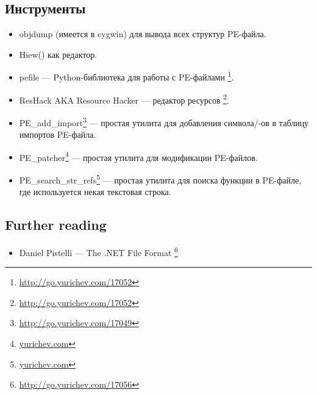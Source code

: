 \subsection{Инструменты}

\begin{itemize}
\item
{}
objdump (имеется в cygwin) для вывода всех структур PE-файла.

\item
{}
Hiew() как редактор.

\item pefile --- Python-библиотека для работы с PE-файлами
\footnote{\url{http://go.yurichev.com/17052}}.

\item
\label{ResHack}
ResHack \acs{AKA} Resource Hacker --- редактор ресурсов
\footnote{\url{http://go.yurichev.com/17052}}.

\item PE\_add\_import\footnote{\url{http://go.yurichev.com/17049}} --- простая утилита для добавления символа/-ов в таблицу импортов PE-файла.

\item PE\_patcher\footnote{\href{http://go.yurichev.com/17054}{yurichev.com}} --- простая утилита для модификации PE-файлов.

\item PE\_search\_str\_refs\footnote{\href{http://go.yurichev.com/17055}{yurichev.com}} --- простая утилита для поиска функции в PE-файле, где используется некая текстовая строка.
\end{itemize}

\subsection{Further reading}

\begin{itemize}
\item Daniel Pistelli --- The .NET File Format \footnote{\url{http://go.yurichev.com/17056}}
\end{itemize}

